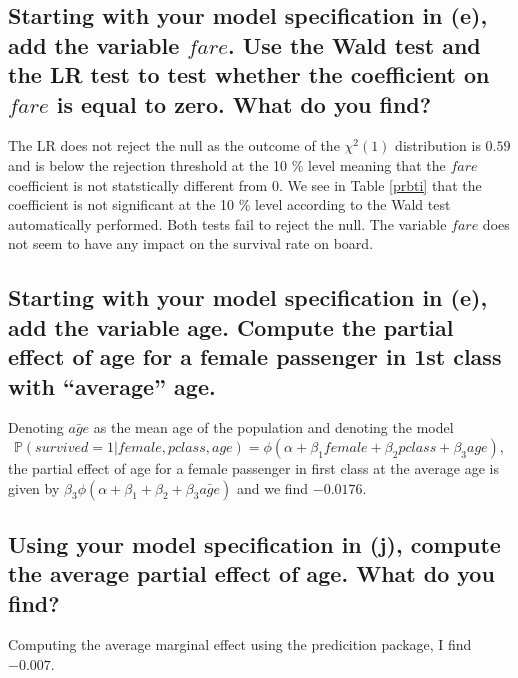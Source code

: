 \documentclass[12pt]{article}
\begin{document}
\subsection{Starting with your model specification in (e), add the variable $fare$. Use the Wald test and the LR test to test whether the coefficient on $fare$ is equal to zero. What do you find?}

The LR does not reject the null as the outcome of the $\chi^2(1)$ distribution is $0.59$ and is below the rejection threshold at the 10 \% level meaning that the $fare$ coefficient is not statstically different from 0. We see in Table \ref{prbti} that the coefficient is not significant at the 10 \% level according to the Wald test automatically performed. Both tests fail to reject the null. The variable $fare$ does not seem to have any impact on the survival rate on board.

\subsection{Starting with your model specification in (e), add the variable age. Compute the partial effect of age for a female passenger in 1st class with “average” age.}

Denoting $\bar{age}$ as the mean age of the population and denoting the model
$$\mathbb{P}(survived = 1 | female, pclass, age) = \phi(\alpha + \beta_1 female + \beta_2 pclass + \beta_3 age),$$
the partial effect of age for a female passenger in first class at the average age is given by $\beta_3 \phi(\alpha + \beta_1 + \beta_2 + \beta_3 \bar{age})$ and we find $-0.0176$.

\subsection{Using your model specification in (j), compute the average partial effect of age. What do you find?}
Computing the average marginal effect using the predicition package, I find $-0.007$.
\end{document}
